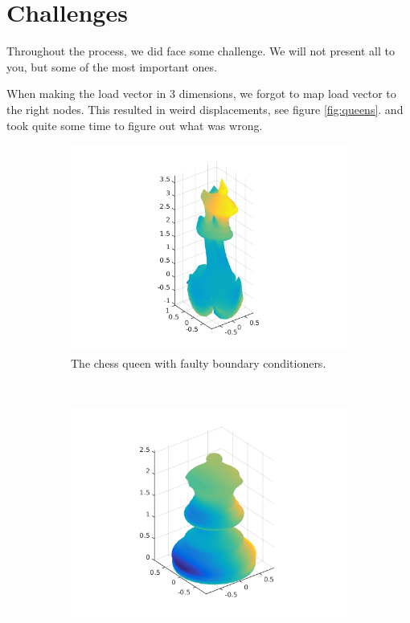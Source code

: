 \section{Challenges}

Throughout the process, we did face some challenge. We will not present all to you, but some of the most important ones. 

When making the load vector in 3 dimensions, we forgot to map load vector to the right nodes. This resulted in weird displacements, see figure \ref{fig:queens}. and took quite some time to figure out what was wrong. 




\begin{figure}[ht]
        \centering
        \begin{subfigure}[b]{0.45 \textwidth}
                \includegraphics[width=\textwidth]{queen_broken}
                \caption{The chess queen with faulty boundary conditioners.}
        \end{subfigure}
        ~
        \begin{subfigure}[b]{0.45 \textwidth}
                \includegraphics[width=\textwidth]{queen_fixed}

\end{subfigure}
\end{figure}
